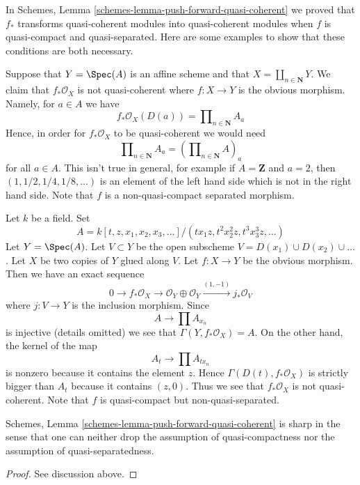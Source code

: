 \noindent
In Schemes, Lemma \ref{schemes-lemma-push-forward-quasi-coherent}
we proved that $f_*$ transforms quasi-coherent modules into quasi-coherent
modules when $f$ is quasi-compact and quasi-separated. Here are some
examples to show that these conditions are both necessary.

\medskip\noindent
Suppose that $Y = \Spec(A)$ is an affine scheme and that
$X = \coprod_{n \in \mathbf{N}} Y$. We claim that $f_*\mathcal{O}_X$
is not quasi-coherent where $f : X \to Y$ is the obvious morphism.
Namely, for $a \in A$ we have
$$
f_*\mathcal{O}_X(D(a)) = \prod\nolimits_{n \in \mathbf{N}} A_a
$$
Hence, in order for $f_*\mathcal{O}_X$ to be quasi-coherent we would need
$$
\prod\nolimits_{n \in \mathbf{N}} A_a
=
\left(\prod\nolimits_{n \in \mathbf{N}} A\right)_a
$$
for all $a \in A$. This isn't true in general, for example if
$A = \mathbf{Z}$ and $a = 2$, then $(1, 1/2, 1/4, 1/8, \ldots)$
is an element of the left hand side which is not in the right hand side.
Note that $f$ is a non-quasi-compact separated morphism.

\medskip\noindent
Let $k$ be a field. Set
$$
A = k[t, z, x_1, x_2, x_3, \ldots]/(tx_1z, t^2x_2^2z, t^3x_3^3z, \ldots)
$$
Let $Y = \Spec(A)$. Let $V \subset Y$ be the open subscheme
$V = D(x_1) \cup D(x_2) \cup \ldots$. Let $X$ be two copies of $Y$
glued along $V$. Let $f : X \to Y$ be the obvious morphism. Then we
have an exact sequence
$$
0 \to f_*\mathcal{O}_X \to
\mathcal{O}_Y \oplus \mathcal{O}_Y \xrightarrow{(1, -1)} j_*\mathcal{O}_V
$$
where $j : V \to Y$ is the inclusion morphism. Since
$$
A \longrightarrow \prod A_{x_n}
$$
is injective (details omitted) we see that $\Gamma(Y, f_*\mathcal{O}_X) = A$.
On the other hand, the kernel of the map
$$
A_t \longrightarrow \prod A_{tx_n}
$$
is nonzero because it contains the element $z$. Hence
$\Gamma(D(t), f_*\mathcal{O}_X)$ is strictly bigger than
$A_t$ because it contains $(z, 0)$. Thus we see that $f_*\mathcal{O}_X$
is not quasi-coherent. Note that $f$ is quasi-compact but
non-quasi-separated.

\begin{lemma}
\label{lemma-pushforward-quasi-coherent}
Schemes, Lemma \ref{schemes-lemma-push-forward-quasi-coherent}
is sharp in the sense that one can neither drop the assumption
of quasi-compactness nor the assumption of quasi-separatedness.
\end{lemma}

\begin{proof}
See discussion above.
\end{proof}








